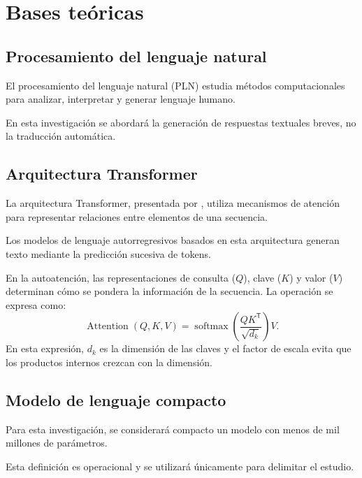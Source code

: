 \section{Bases teóricas}\label{bases-teuxf3ricas}

\subsection{Procesamiento del lenguaje natural}\label{procesamiento-del-lenguaje-natural}

El procesamiento del lenguaje natural (PLN) estudia métodos computacionales para analizar, interpretar y generar lenguaje humano.

En esta investigación se abordará la generación de respuestas textuales breves, no la traducción automática.

\subsection{Arquitectura Transformer}\label{arquitectura-transformer}

La arquitectura Transformer, presentada por \textcite{Vaswani2017}, utiliza mecanismos de atención para representar relaciones entre elementos de una secuencia.

Los modelos de lenguaje autorregresivos basados en esta arquitectura generan texto mediante la predicción sucesiva de tokens.

En la autoatención, las representaciones de consulta ($Q$), clave ($K$) y valor ($V$) determinan cómo se pondera la información de la secuencia. La operación se expresa como:
\begin{equation}
\operatorname{Attention}(Q,K,V)=\operatorname{softmax}\left(\frac{QK^{\mathsf T}}{\sqrt{d_k}}\right)V.
\label{eq:autoatencion}
\end{equation}
En esta expresión, $d_k$ es la dimensión de las claves y el factor de escala evita que los productos internos crezcan con la dimensión.

\subsection{Modelo de lenguaje compacto}\label{modelo-de-lenguaje-compacto}

Para esta investigación, se considerará compacto un modelo con menos de mil millones de parámetros.

Esta definición es operacional y se utilizará únicamente para delimitar el estudio.

